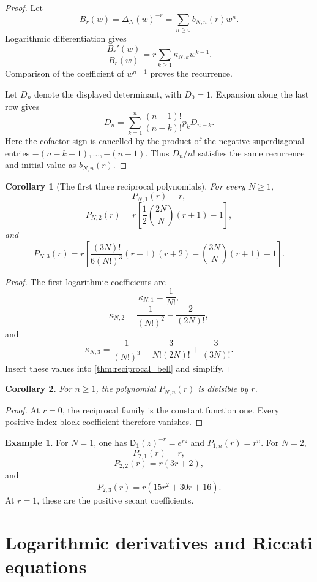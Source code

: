 \documentclass[11pt,letterpaper]{article}
\newtheorem{corollary}[corollary]{Corollary}
\theoremstyle{definition}
\newtheorem{example}[example]{Example}
\theoremstyle{remark}
\newcommand{\Dfun}{\mathsf D}
\begin{document}
\begin{proof}
Let
\[
B_r(w)=\Delta_N(w)^{-r}
=
\sum_{n\geq0}b_{N,n}(r)w^n.
\]
Logarithmic differentiation gives
\[
\frac{B_r'(w)}{B_r(w)}
=
r\sum_{k\geq1}\kappa_{N,k}w^{k-1}.
\]
Comparison of the coefficient of $w^{n-1}$ proves the recurrence.

Let $D_n$ denote the displayed determinant, with $D_0=1$.  Expansion along the last row gives
\[
D_n
=
\sum_{k=1}^{n}
\frac{(n-1)!}{(n-k)!}p_kD_{n-k}.
\]
Here the cofactor sign is cancelled by the product of the negative
superdiagonal entries $-(n-k+1),\ldots,-(n-1)$.
Thus $D_n/n!$ satisfies the same recurrence and initial value as $b_{N,n}(r)$.
\end{proof}

\begin{corollary}[The first three reciprocal polynomials]\label{cor:first_reciprocal_polynomials}
For every $N\geq1$,
\[
P_{N,1}(r)=r,
\]
\[
P_{N,2}(r)
=
r\left[
\frac12\binom{2N}{N}(r+1)-1
\right],
\]
and
\[
P_{N,3}(r)
=
r\left[
\frac{(3N)!}{6(N!)^3}(r+1)(r+2)
-
\binom{3N}{N}(r+1)
+1
\right].
\]
\end{corollary}

\begin{proof}
The first logarithmic coefficients are
\[
\kappa_{N,1}=\frac1{N!},
\]
\[
\kappa_{N,2}=\frac1{(N!)^2}-\frac2{(2N)!},
\]
and
\[
\kappa_{N,3}
=
\frac1{(N!)^3}
-
\frac3{N!(2N)!}
+
\frac3{(3N)!}.
\]
Insert these values into \cref{thm:reciprocal_bell} and simplify.
\end{proof}

\begin{corollary}\label{cor:factor_r}
For $n\geq1$, the polynomial $P_{N,n}(r)$ is divisible by $r$.
\end{corollary}

\begin{proof}
At $r=0$, the reciprocal family is the constant function one.  Every positive-index block coefficient therefore vanishes.
\end{proof}

\begin{example}\label{ex:reciprocal_polynomials}
For $N=1$, one has $\Dfun_1(z)^{-r}=e^{rz}$ and $P_{1,n}(r)=r^n$.  For $N=2$,
\[
P_{2,1}(r)=r,
\]
\[
P_{2,2}(r)=r(3r+2),
\]
and
\[
P_{2,3}(r)=r(15r^2+30r+16).
\]
At $r=1$, these are the positive secant coefficients.
\end{example}

\section{Logarithmic derivatives and Riccati equations}\label{sec:tangent}
\end{document}
